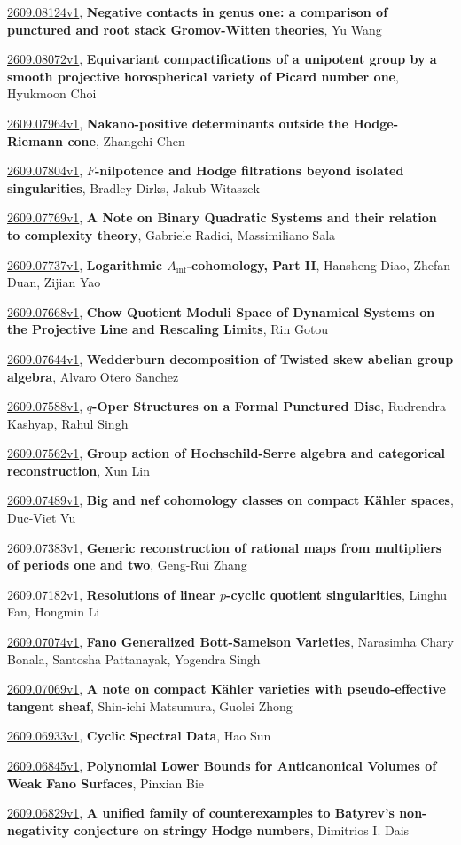 \documentclass[9pt, a4paper]{article}
\theoremstyle{plain}
\theoremstyle{definition}
\theoremstyle{remark}
\newcommand{\arxiv}[3]{\href{https://arxiv.org/abs/#1}{#1}, \textbf{\textcolor{arxivblue}{#2}}, #3}
\begin{document}
\arxiv{2609.08124v1}{Negative contacts in genus one: a comparison of punctured and root stack Gromov-Witten theories}{Yu Wang}

\arxiv{2609.08072v1}{Equivariant compactifications of a unipotent group by a smooth projective horospherical variety of Picard number one}{Hyukmoon Choi}

\arxiv{2609.07964v1}{Nakano-positive determinants outside the Hodge-Riemann cone}{Zhangchi Chen}

\arxiv{2609.07804v1}{$F$-nilpotence and Hodge filtrations beyond isolated singularities}{Bradley Dirks, Jakub Witaszek}

\arxiv{2609.07769v1}{A Note on Binary Quadratic Systems and their relation to complexity theory}{Gabriele Radici, Massimiliano Sala}

\arxiv{2609.07737v1}{Logarithmic $A_{\mathrm{inf}}$-cohomology, Part II}{Hansheng Diao, Zhefan Duan, Zijian Yao}

\arxiv{2609.07668v1}{Chow Quotient Moduli Space of Dynamical Systems on the Projective Line and Rescaling Limits}{Rin Gotou}

\arxiv{2609.07644v1}{Wedderburn decomposition of Twisted skew abelian group algebra}{Alvaro Otero Sanchez}

\arxiv{2609.07588v1}{$q$-Oper Structures on a Formal Punctured Disc}{Rudrendra Kashyap, Rahul Singh}

\arxiv{2609.07562v1}{Group action of Hochschild-Serre algebra and categorical reconstruction}{Xun Lin}

\arxiv{2609.07489v1}{Big and nef cohomology classes on compact Kähler spaces}{Duc-Viet Vu}

\arxiv{2609.07383v1}{Generic reconstruction of rational maps from multipliers of periods one and two}{Geng-Rui Zhang}

\arxiv{2609.07182v1}{Resolutions of linear $p$-cyclic quotient singularities}{Linghu Fan, Hongmin Li}

\arxiv{2609.07074v1}{Fano Generalized Bott-Samelson Varieties}{Narasimha Chary Bonala, Santosha Pattanayak, Yogendra Singh}

\arxiv{2609.07069v1}{A note on compact Kähler varieties with pseudo-effective tangent sheaf}{Shin-ichi Matsumura, Guolei Zhong}

\arxiv{2609.06933v1}{Cyclic Spectral Data}{Hao Sun}

\arxiv{2609.06845v1}{Polynomial Lower Bounds for Anticanonical Volumes of Weak Fano Surfaces}{Pinxian Bie}

\arxiv{2609.06829v1}{A unified family of counterexamples to Batyrev's non-negativity conjecture on stringy Hodge numbers}{Dimitrios I. Dais}
\end{document}

